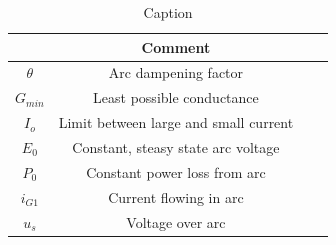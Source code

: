 \begin{table}[h]
    \centering
    \begin{tabular}{c|c|c|c}
         & Comment &  &\\ \hline
        $\theta$  & Arc dampening factor &  &\\
        $G_{min}$ & Least possible conductance &  &\\
        $I_o$     & Limit between large and small current &  &\\
        $E_0$     & Constant, steasy state arc voltage &  &\\
        $P_0$     & Constant power loss from arc &  & \\
        $i_{G1}$  & Current flowing in arc      &  & \\
        $u_s$     & Voltage over arc            &  &
    \end{tabular}
    \caption{Caption}
    \label{tab:my_label}
\end{table}
